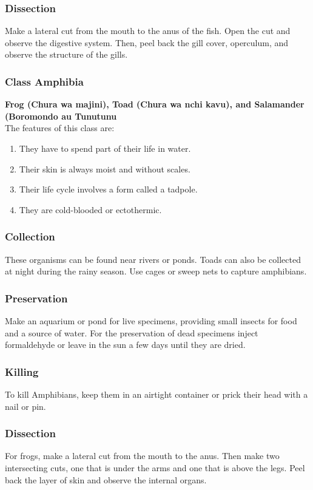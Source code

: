 \subsubsection{Dissection}
Make a lateral cut from the mouth to the anus of the fish. Open the cut and observe the digestive system. Then, peel back the gill cover, operculum, and observe the structure of the gills.



\subsubsection{Class Amphibia}
\textbf{Frog (Chura wa majini), Toad (Chura wa nchi kavu), and Salamander (Boromondo au Tunutunu}\\The features of this class are:
\begin{enumerate}
\item{They have to spend part of their life in water.}
\item{Their skin is always moist and without scales.}
\item{Their life cycle involves a form called a tadpole.}
\item{They are cold-blooded or ectothermic.}
\end{enumerate}

\subsubsection{Collection}
These organisms can be found near rivers or ponds. Toads can also be collected at night during the rainy season. Use cages or sweep nets to capture amphibians.

\subsubsection{Preservation} 
Make an aquarium or pond for live specimens, providing small insects for food and a source of water. For the preservation of dead specimens inject formaldehyde or leave in the sun a few days until they are dried.

\subsubsection{Killing}
To kill Amphibians, keep them in an airtight container or prick their head with a nail or pin.

\subsubsection{Dissection}
For frogs, make a lateral cut from the mouth to the anus. Then make two intersecting cuts, one that is under the arms and one that is above the legs. Peel back the layer of skin and observe the internal organs.


